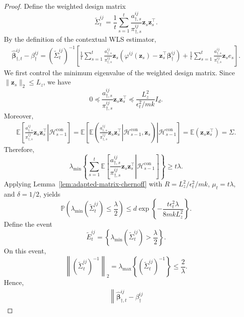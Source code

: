 \documentclass[12pt]{article}
\begin{document}
\begin{proof}
Define the weighted design matrix
\[
\widetilde\Sigma_t^{ij}
=
\frac1t
\sum_{s=1}^t
\frac{a_{\dagger,s}^{ij}}{\pi_{\dagger,s}^{ij}
}
\bm z_s\bm z_s^\top.
\]
By the definition of the contextual WLS estimator,
\begin{align*}
\widehat{\bm\beta}_{\dagger,t}^{ij}-\beta_\dagger^{ij} =
\left(
\widetilde\Sigma_t^{ij}
\right)^{-1}
\left[
\frac1t
\sum_{s=1}^t
\frac{a_{\dagger,s}^{ij}}{\pi_{\dagger,s}^{ij}}
\bm z_s
\left(\varphi^{ij}(\bm z_s) - \bm z_s^\top\bm\beta_\dagger^{ij} \right)
+
\frac1t
\sum_{s=1}^t
\frac{a_{\dagger,s}^{ij}}{\pi_{\dagger,s}^{ij}}
\bm z_s e_s
\right].
\end{align*}
We first control the minimum eigenvalue of the weighted design matrix.
Since $\|\bm z_s\|_2\le L_z$, we have
\[
0
\preceq
\frac{ a_{\dagger,s}^{ij} }{ \pi_{\dagger,s}^{ij} } \bm z_s\bm z_s^\top
\preceq
\frac{L_z^2}{\epsilon_t^2/mk}I_d.
\]
Moreover,
\begin{align*}
\mathbb E
\left[
\left.
\frac{ a_{\dagger,s}^{ij} }{ \pi_{\dagger,s}^{ij} } \bm z_s\bm z_s^\top
\right|
\mathcal H_{s-1}^{\mathrm{con}}
\right]
=\mathbb E
\left[
\left.
\mathbb E
\left(
\left.
\frac{a_{\dagger,s}^{ij}}{\pi_{\dagger,s}^{ij}}
\bm z_s\bm z_s^\top
\right|
\mathcal H_{s-1}^{\mathrm{con}},
\bm z_s
\right)
\right|
\mathcal H_{s-1}^{\mathrm{con}}
\right]
=\mathbb E
\left(\bm z_s\bm z_s^\top\right)
=\Sigma.
\end{align*}
Therefore,
\[
\lambda_{\min}
\left\{
\sum_{s=1}^t
\mathbb E
\left[
\left.
\frac{ a_{\dagger,s}^{ij} }{ \pi_{\dagger,s}^{ij} } \bm z_s\bm z_s^\top
\right|
\mathcal H_{s-1}^{\mathrm{con}}
\right]
\right\}
\ge
t\lambda.
\]
Applying Lemma~\ref{lem:adapted-matrix-chernoff} with $R={L_z^2}/{\epsilon_t^2/mk}$, $\mu_t=t\lambda$, and $\delta=1/2$, yields
\begin{equation}
\label{equ:wls_weighted_design_tail}
\mathbb P
\left(
\lambda_{\min}
\left(
\widetilde\Sigma_t^{ij}
\right)
\le
\frac{\lambda}{2}\right)
\le
d\exp
\left\{
- \frac{t\epsilon_t^2\lambda}{8mkL_z^2}
\right\}.
\end{equation}
Define the event
\[
\widetilde E_t^{ij}
=
\left\{
\lambda_{\min}
\left(
\widetilde\Sigma_t^{ij}
\right)
>
\frac{\lambda}{2}
\right\}.
\]
On this event,
\[
\left\|
\left(
\widetilde\Sigma_t^{ij}
\right)^{-1}
\right\|_2
= \lambda_{\max}
\left\{
\left(\widetilde\Sigma_t^{ij} \right)^{-1}
\right\}
\le
\frac{2}{\lambda}.
\]
Hence,
\begin{align*}
\left\|
\widehat{\bm\beta}_{\dagger,t}^{ij}
-
\beta_\dagger^{ij}

\end{align*}
\end{proof}
\end{document}
